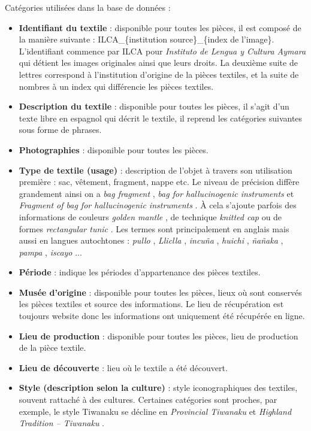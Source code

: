 \noindent Catégories utilisées dans la base de données : 
\begin{citer}
	\begin{itemize}
		\item \textbf{Identifiant du textile} : disponible pour toutes les pièces, il est composé de la manière suivante : ILCA\_\{institution source\}\_\{index de l'image\}. L'identifiant commence par ILCA pour \textit{Instituto de Lengua y Cultura Aymara} qui détient les images originales ainsi que leurs droits. La deuxième suite de lettres correspond à l'institution d'origine de la pièces textiles, et la suite de nombres à un index qui différencie les pièces textiles.
		\item  \textbf{Description du textile} : disponible pour toutes les pièces, il s'agit d'un texte libre en espagnol qui décrit le textile, il reprend les catégories suivantes sous forme de phrases.
		\item  \textbf{Photographies} : disponible pour toutes les pièces.
		\item  \textbf{Type de textile (usage)} : description de l'objet à travers son utilisation première : sac, vêtement, fragment, nappe etc. Le niveau de précision diffère grandement ainsi on a \og \textit{bag fragment} \fg, \og \textit{bag for hallucinogenic instruments} \fg\: et \og \textit{Fragment of bag for hallucinogenic instruments} \fg. À cela s'ajoute parfois des informations de couleurs \og \textit{golden mantle} \fg, de technique \og \textit{knitted cap} \fg \:ou de formes \og \textit{rectangular tunic} \fg.
Les termes sont principalement en anglais mais aussi en langues autochtones : \og \textit{pullo} \fg, \og \textit{Lliclla} \fg, \og \textit{incuña} \fg, \og \textit{huichi} \fg, \textit{ñañaka} \fg, \og \textit{pampa} \fg, \og \textit{iscayo} \fg...
		\item  \textbf{Période} : indique les périodes d'appartenance des pièces textiles.
		\item  \textbf{Musée d'origine} : disponible pour toutes les pièces, lieux où sont conservés les pièces textiles et source des informations. Le lieu de récupération est toujours website donc les informations ont uniquement été récupérée en ligne.
		\item \textbf{Lieu de production} : disponible pour toutes les pièces, lieu de production de la pièce textile.
		\item  \textbf{Lieu de découverte} : lieu où le textile a été découvert.
		\item  \textbf{Style (description selon la culture)} : style iconographiques des textiles, souvent rattaché à des cultures. Certaines catégories sont proches, par exemple, le style Tiwanaku se décline en \og \textit{Provincial Tiwanaku} \fg\: et \og \textit{Highland Tradition -- Tiwanaku} \fg.

\end{itemize}
\end{citer}
